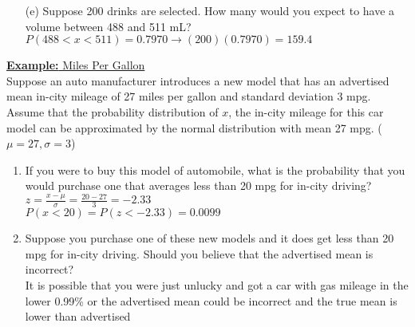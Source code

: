 \documentclass[a4paper]{article}
\let\bf\textbf
\begin{document}
\begin{shaded}
\begin{enumerate}
\begin{center}
        \end{center}
        \item[(e)] Suppose 200 drinks are selected. How many would you expect to have a volume between 488 and 511 mL?
        \vspace{1mm}\\
        $P(488 < x < 511) = 0.7970 \to (200)(0.7970) = 159.4$
    \end{enumerate}
\end{shaded}

\begin{shaded}
    \underline{\bf{Example:} Miles Per Gallon}
    \vspace{2mm}\\
    Suppose an auto manufacturer introduces a new model that has an advertised mean in-city mileage of 27 miles per gallon and standard deviation 3 mpg. Assume that the probability distribution of $x$, the in-city mileage for this car model can be approximated by the normal distribution with mean 27 mpg. ($\mu = 27, \sigma = 3$)
    \begin{enumerate}
        \item If you were to buy this model of automobile, what is the probability that you would purchase one that averages less than 20 mpg for in-city driving?
        \vspace{1mm}\\
        $\displaystyle z = \frac{x - \mu}{\sigma} = \frac{20 - 27}{3} = -2.33$
        \vspace{1mm}\\
        $P(x < 20) = P(z < -2.33) = 0.0099$
        \item Suppose you purchase one of these new models and it does get less than 20 mpg for in-city driving. Should you believe that the advertised mean is incorrect?
        \vspace{1mm}\\
        It is possible that you were just unlucky and got a car with gas mileage in the lower 0.99\% or the advertised mean could be incorrect and the true mean is lower than advertised 
    \end{enumerate}
\end{shaded}
\end{document}
